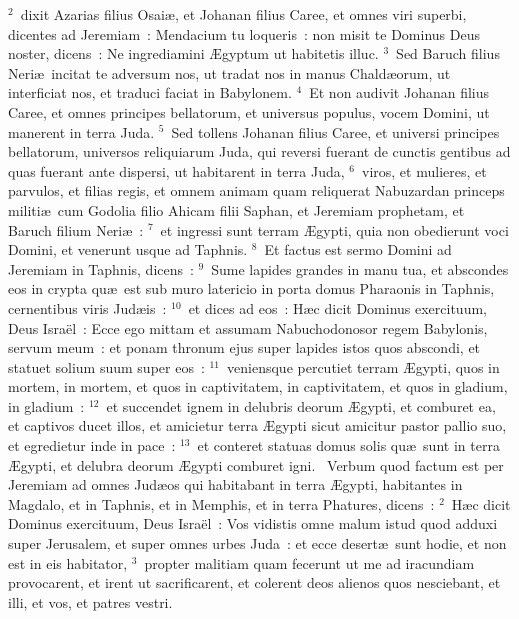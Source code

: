 ${}^{2}$~dixit Azarias filius Osai\ae , et Johanan filius Caree, et omnes viri superbi, dicentes ad Jeremiam~: Mendacium tu loqueris~: non misit te Dominus Deus noster, dicens~: Ne ingrediamini \AE gyptum ut habitetis illuc.
${}^{3}$~Sed Baruch filius Neri\ae\ incitat te adversum nos, ut tradat nos in manus Chald\ae orum, ut interficiat nos, et traduci faciat in Babylonem.
${}^{4}$~Et non audivit Johanan filius Caree, et omnes principes bellatorum, et universus populus, vocem Domini, ut manerent in terra Juda.
${}^{5}$~Sed tollens Johanan filius Caree, et universi principes bellatorum, universos reliquiarum Juda, qui reversi fuerant de cunctis gentibus ad quas fuerant ante dispersi, ut habitarent in terra Juda,
${}^{6}$~viros, et mulieres, et parvulos, et filias regis, et omnem animam quam reliquerat Nabuzardan princeps militi\ae\ cum Godolia filio Ahicam filii Saphan, et Jeremiam prophetam, et Baruch filium Neri\ae~:
${}^{7}$~et ingressi sunt terram \AE gypti, quia non obedierunt voci Domini, et venerunt usque ad Taphnis.
${}^{8}$~Et factus est sermo Domini ad Jeremiam in Taphnis, dicens~:
${}^{9}$~Sume lapides grandes in manu tua, et abscondes eos in crypta qu\ae\ est sub muro latericio in porta domus Pharaonis in Taphnis, cernentibus viris Jud\ae is~:
${}^{10}$~et dices ad eos~: H\ae c dicit Dominus exercituum, Deus Isra\"el~: Ecce ego mittam et assumam Nabuchodonosor regem Babylonis, servum meum~: et ponam thronum ejus super lapides istos quos abscondi, et statuet solium suum super eos~:
${}^{11}$~veniensque percutiet terram \AE gypti, quos in mortem, in mortem, et quos in captivitatem, in captivitatem, et quos in gladium, in gladium~:
${}^{12}$~et succendet ignem in delubris deorum \AE gypti, et comburet ea, et captivos ducet illos, et amicietur terra \AE gypti sicut amicitur pastor pallio suo, et egredietur inde in pace~:
${}^{13}$~et conteret statuas domus solis qu\ae\ sunt in terra \AE gypti, et delubra deorum \AE gypti comburet igni.
~\lettrine[lines=10,image=true,loversize=0.05,lraise=-0.03]{V}{}erbum quod factum est per Jeremiam ad omnes Jud\ae os qui habitabant in terra \AE gypti, habitantes in Magdalo, et in Taphnis, et in Memphis, et in terra Phatures, dicens~:
${}^{2}$~H\ae c dicit Dominus exercituum, Deus Isra\"el~: Vos vidistis omne malum istud quod adduxi super Jerusalem, et super omnes urbes Juda~: et ecce desert\ae\ sunt hodie, et non est in eis habitator,
${}^{3}$~propter malitiam quam fecerunt ut me ad iracundiam provocarent, et irent ut sacrificarent, et colerent deos alienos quos nesciebant, et illi, et vos, et patres vestri.

